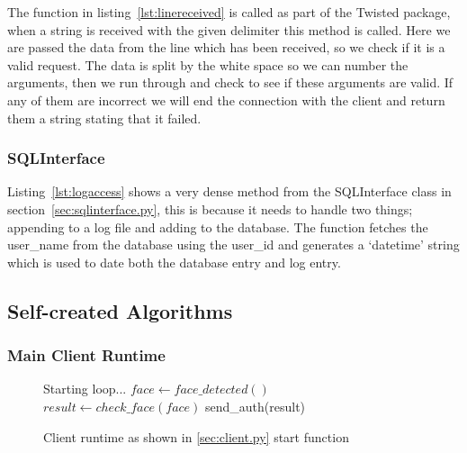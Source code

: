 \documentclass[a4paper]{article}
\begin{document}
        

        The function in listing~\ref{lst:linereceived} is called as part of the Twisted package, when a string is received with the given delimiter this method is called. Here we are passed the
        data from the line which has been received, so we check if it is a valid request. The data is split by the white space so we can number the arguments, then
        we run through and check to see if these arguments are valid. If any of them are incorrect we will end the connection with the client and return them a string
        stating that it failed.

        \subsubsection{SQLInterface}

        

        Listing~\ref{lst:logaccess} shows a very dense method from the SQLInterface class in section~\ref{sec:sqlinterface.py}, this is because it needs to handle two things;
        appending to a log file and adding to the database. The function fetches the user\_name from the database using the user\_id and generates a `datetime' string which is
        used to date both the database entry and log entry.
    \newpage
    \subsection{Self-created Algorithms}
        \subsubsection{Main Client Runtime}
        \begin{figure}[H]
        \caption{Client runtime as shown in \ref{sec:client.py} start function}
            \begin{algorithmic}
                \PRINT Starting loop...
                    \STATE $face\gets face\_detected()$
                        \STATE $result\gets check\_face(face)$
                            \STATE send\_auth(result)
                        \ENDIF
                    \ENDIF
                \ENDWHILE
            \end{algorithmic}
        \end{figure}
\end{document}
